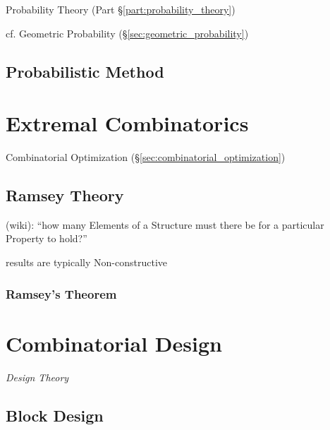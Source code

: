 Probability Theory (Part \S\ref{part:probability_theory})

cf. Geometric Probability (\S\ref{sec:geometric_probability})



\subsection{Probabilistic Method}\label{sec:probabilistic_method}



\section{Extremal Combinatorics}\label{sec:extremal_combinatorics}

Combinatorial Optimization (\S\ref{sec:combinatorial_optimization})



\subsection{Ramsey Theory}\label{sec:ramsey_theory}

(wiki): ``how many Elements of a Structure must there be for a particular
Property to hold?''

results are typically Non-constructive



\subsubsection{Ramsey's Theorem}\label{sec:ramseys_theorem}



\section{Combinatorial Design}\label{sec:combinatorial_design}

\emph{Design Theory}



\subsection{Block Design}\label{sec:block_design}
